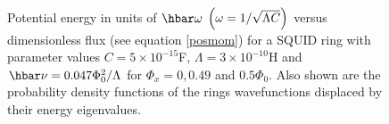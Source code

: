 \documentclass[twocolumn,a4paper,superscriptaddress,showpacs,floatfix,pra]{revtex4}
\begin{document}
\begin{figure}[!t]
\begin{center}
\end{center}
\caption{Potential energy in units  of $\hbar \protect\omega $ $\left(
\protect\omega    =1/\protect\sqrt{\Lambda    C}\right)    $    versus
dimensionless  flux (see  equation \protect\ref{posmom})  for  a SQUID
ring  with parameter values  $C=5\times 10^{-15}$F,  $\Lambda =3\times
10^{-10}$H  and $\hbar \protect\nu  =0.047\Phi _{0}^{2}/\Lambda  $ for
$\Phi _{x}=0,0.49$ and $0.5\Phi _{0}$.  Also shown are the probability
density functions of the rings wavefunctions displaced by their energy
eigenvalues.}
\label{f1}
\end{figure}
\end{document}
